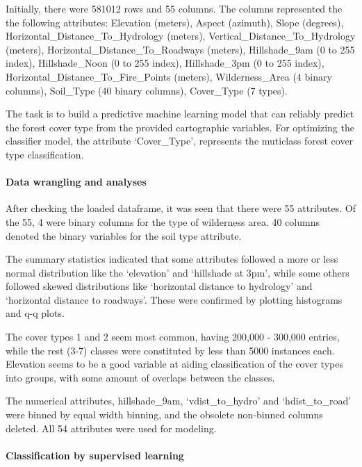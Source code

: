 \documentclass[11pt]{article}
\begin{document}
Initially, there were 581012 rows and 55 columns. The columns
represented the the following attributes: Elevation (meters), Aspect
(azimuth), Slope (degrees), Horizontal\_Distance\_To\_Hydrology
(meters), Vertical\_Distance\_To\_Hydrology (meters),
Horizontal\_Distance\_To\_Roadways (meters), Hillshade\_9am (0 to 255
index), Hillshade\_Noon (0 to 255 index), Hillshade\_3pm (0 to 255
index), Horizontal\_Distance\_To\_Fire\_Points (meters),
Wilderness\_Area (4 binary columns), Soil\_Type (40 binary columns),
Cover\_Type (7 types).

The task is to build a predictive machine learning model that can
reliably predict the forest cover type from the provided cartographic
variables. For optimizing the classifier model, the attribute
`Cover\_Type', represents the muticlass forest cover type
classification.

\hypertarget{data-wrangling-and-analyses}{%
\paragraph{Data wrangling and
analyses}\label{data-wrangling-and-analyses}}

After checking the loaded dataframe, it was seen that there were 55
attributes. Of the 55, 4 were binary columns for the type of wilderness
area. 40 columns denoted the binary variables for the soil type
attribute.

The summary statistics indicated that some attributes followed a more or
less normal distribution like the `elevation' and `hillshade at 3pm',
while some others followed skewed distributions like `horizontal
distance to hydrology' and `horizontal distance to roadways'. These were
confirmed by plotting histograms and q-q plots.

The cover types 1 and 2 seem most common, having 200,000 - 300,000
entries, while the rest (3-7) classes were constituted by less than 5000
instances each. Elevation seems to be a good variable at aiding
classification of the cover types into groups, with some amount of
overlaps between the classes.

The numerical attributes, hillshade\_9am, `vdist\_to\_hydro' and
`hdist\_to\_road' were binned by equal width binning, and the obsolete
non-binned columns deleted. All 54 attributes were used for modeling.

\hypertarget{classification-by-supervised-learning}{%
\paragraph{Classification by supervised
learning}\label{classification-by-supervised-learning}}
\end{document}
